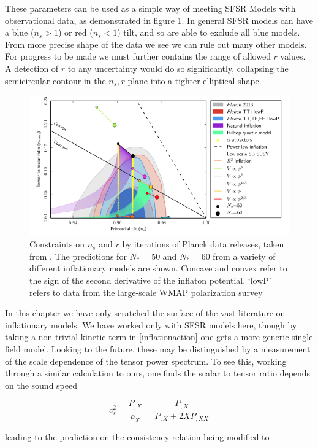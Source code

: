 \documentclass[a4paper,10pt]{article}
\begin{document}
These parameters can be used as a simple way of meeting SFSR Models with observational data, as demonstrated in figure \ref{inflationconstraints}. In general SFSR models can have a blue ($n_s>1$) or red ($n_s<1$) tilt, and so are able to exclude all blue models. From more precise shape of the data we see we can rule out many other models. For progress to be made we must further contains the range of allowed $r$ values. A detection of $r$ to any uncertainty would do so significantly, collapsing the semicircular contour in the $n_s,r$ plane into a tighter elliptical shape.

\begin{figure}[h]
  \includegraphics[width=0.7\linewidth]{modeldepconstraints.png}
  \centering
  \caption{Constraints on $n_s$ and $r$ by iterations of Planck data releases, taken from \cite{QBM}. The predictions for $N_*=50$ and $N_*=60$ from a variety of different inflationary models are shown. Concave and convex refer to the sign of the second derivative of the inflaton potential. `lowP' refers to data from the large-scale WMAP polarization survey}
\label{inflationconstraints}  
\end{figure}


In this chapter we have only scratched the surface of the vast literature on inflationary models. We have worked only with SFSR models here, though by taking a non trivial kinetic term in \ref{inflationaction} one gets a more generic single field model. Looking to the future, these may be distinguished by a measurement of the scale dependence of the tensor power spectrum. To see this, working through a similar calculation to ours, one finds the scalar to tensor ratio depends on the sound speed

\begin{equation}
c_s^2 = \frac{P_{,X}}{\rho_X} = \frac{P_{,X}}{P_{,X}+2XP_{,XX}}
\end{equation}

leading to the prediction on the consistency relation being modified to 
\end{document}
